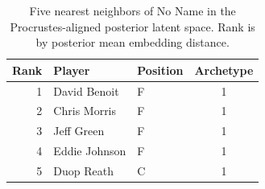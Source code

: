 \begin{table}[htbp]
  \centering\small
  \begin{tabular}{rllc}
    \toprule
    Rank & Player & Position & Archetype \\
    \midrule
    1 & David Benoit & F & 1 \\
    2 & Chris Morris & F & 1 \\
    3 & Jeff Green & F & 1 \\
    4 & Eddie Johnson & F & 1 \\
    5 & Duop Reath & C & 1 \\
    \bottomrule
  \end{tabular}
  \caption{Five nearest neighbors of No Name in the Procrustes-aligned posterior latent space. Rank is by posterior mean embedding distance.}
  \label{tab:No_Name_neighbors}
\end{table}

